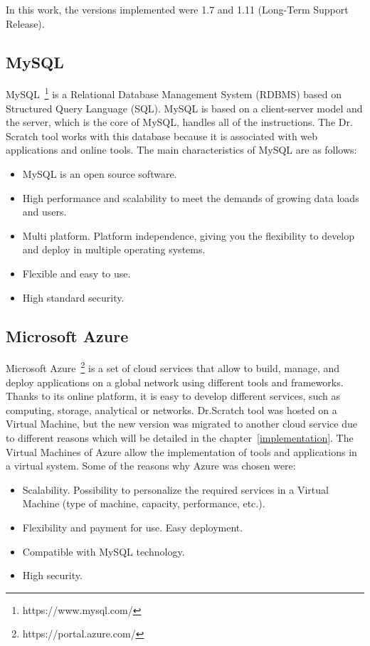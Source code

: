 In this work, the versions implemented were 1.7 and 1.11 (Long-Term Support Release).


\subsection{MySQL}
\label{subsec:mysql}

MySQL~\footnote{https://www.mysql.com/} is a Relational Database Management System (RDBMS) based on Structured Query Language (SQL). MySQL is based on a client-server model and the server, which is the core of MySQL, handles all of the instructions. The Dr. Scratch tool works with this database because it is associated with web applications and online tools. The main characteristics of MySQL are as follows:


\begin{itemize}
  \item MySQL is an open source software.
  \item High performance and scalability to meet the demands of growing data loads and users.
  \item Multi platform. Platform independence, giving you the flexibility to develop and deploy in multiple operating systems.
  \item Flexible and easy to use.
  \item High standard security.
\end{itemize}  

 

\subsection{Microsoft Azure}
\label{subsec:azure}

Microsoft Azure~\footnote{https://portal.azure.com/} is a set of cloud services that allow to build, manage, and deploy applications on a global network using different tools and frameworks. Thanks to its online platform, it is easy to develop different services, such as computing, storage, analytical or networks. Dr.Scratch tool was hosted on a Virtual Machine, but the new version was migrated to another cloud service due to different reasons which will be detailed in the chapter~\ref{implementation}. The Virtual Machines of Azure allow the implementation of tools and applications in a virtual system. Some of the reasons why Azure was chosen were:

\begin{itemize}
    \item Scalability. Possibility to personalize the required services in a Virtual Machine (type of machine, capacity, performance, etc.).
    \item Flexibility and payment for use. Easy deployment.
    \item Compatible with MySQL technology.
    \item High security.
\end{itemize}


